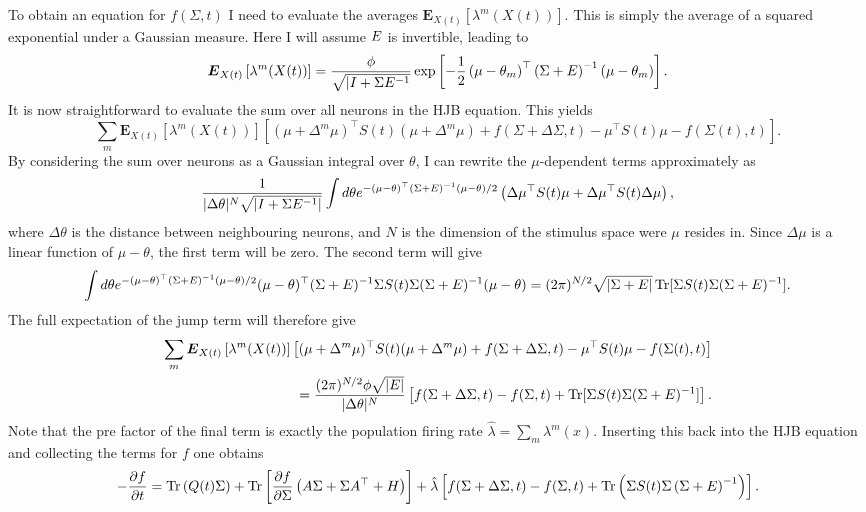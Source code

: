 To obtain an equation for $f(\Sigma,t)$ I need to evaluate the averages $\boldsymbol{E}_{X(t)}\left[\lambda^m(X(t))\right]$. This is simply the average of a squared exponential under
a Gaussian measure. Here I will assume $E$ is invertible, leading to
\[
\boldsymbol{E}_{X(t)}\left[\lambda^m(X(t))\right] = \frac{\phi}{\sqrt{|I+\Sigma E^{-1}}} \exp\left[-\frac{1}{2} \left(\mu - \theta_m\right)^\top\left(\Sigma+E\right)^{-1} \left( \mu - \theta_m\right)\right].
\]
It is now straightforward to evaluate the sum over all neurons in the HJB equation. This yields
\[
 \sum_m \boldsymbol{E}_{X(t)}\left[\lambda^m(X(t))\right] \left[(\mu+\Delta^m\mu)^\top S(t) (\mu+\Delta^m\mu)+ f(\Sigma + \Delta\Sigma,t) -\mu^\top S(t) \mu -f(\Sigma(t),t)\right].
\]
By considering the sum over neurons as a Gaussian integral over $\theta$, I can rewrite the $\mu$-dependent terms approximately as
\[
\frac{1}{|\Delta \theta|^N \sqrt{| I + \Sigma E^{-1}|}} \int d\theta e^{-(\mu-\theta)^\top(\Sigma+E)^{-1}(\mu-\theta)/2} \left(\Delta \mu^\top S(t) \mu + \Delta \mu^\top S(t) \Delta \mu\right),
\]
where $\Delta\theta$ is the distance between neighbouring neurons, and $N$ is the dimension of the stimulus space were $\mu$ resides in.
Since $\Delta \mu$ is a linear function of $\mu-\theta$, the first term will be zero. The second term will give
\[
 \int d\theta e^{-(\mu-\theta)^\top(\Sigma+E)^{-1}(\mu-\theta)/2} (\mu-\theta)^\top (\Sigma + E)^{-1} \Sigma S(t) \Sigma (\Sigma+E)^{-1} (\mu-\theta) =(2\pi)^{N/2} \sqrt{|\Sigma+E|}\operatorname{Tr}[\Sigma S(t) \Sigma (\Sigma+E)^{-1}].
\]
The full expectation of the jump term will therefore give
\begin{align}
 \sum_m \boldsymbol{E}_{X(t)}\left[\lambda^m(X(t))\right] \left[(\mu+\Delta^m\mu)^\top S(t) (\mu+\Delta^m\mu)+ f(\Sigma + \Delta\Sigma,t) -\mu^\top S(t) \mu -f(\Sigma(t),t)\right]\nonumber\\
= \frac{(2\pi)^{N/2}\phi\sqrt{|E|}}{|\Delta \theta|^N} \left[f(\Sigma+\Delta\Sigma,t) - f(\Sigma,t) + \operatorname{Tr}[\Sigma S(t) \Sigma (\Sigma+E)^{-1}]\right].
\end{align}
Note that the pre factor of the final term is exactly the population firing rate $\hat{\lambda} = \sum_m \lambda^m(x)$.
Inserting this back into the HJB equation and collecting the terms for $f$ one obtains
\begin{equation}
-\frac{\partial f}{\partial t} = \operatorname{Tr}\left(Q(t) \Sigma\right) +\operatorname{Tr}\left[ \frac{\partial f}{\partial \Sigma} \left(A\Sigma + \Sigma A^\top + H\right) \right]+ \hat{\lambda} \left[f(\Sigma+\Delta\Sigma,t) - f(\Sigma,t) + \operatorname{Tr}\left(\Sigma S(t) \Sigma \left(\Sigma+E\right)^{-1}\right)\right].
\end{equation}